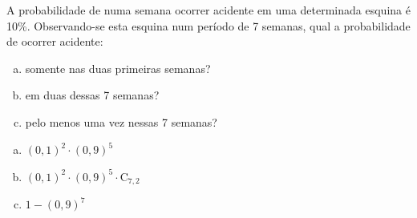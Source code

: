 \begin{ex}
  A probabilidade de numa semana ocorrer acidente em uma determinada esquina é 10\%. Observando-se esta esquina num período de 7 semanas, qual a probabilidade de ocorrer acidente:
    \begin{enumerate}[(a)]
    \item somente nas duas primeiras semanas?
    \item em duas dessas 7 semanas?
    \item pelo menos uma vez nessas 7 semanas?
    \end{enumerate}
      \begin{sol}
        \phantom{A}
         \begin{enumerate} [(a)]
             \item $(0,1)^2\cdot(0,9)^5$
             \item $(0,1)^2\cdot(0,9)^5\cdot\mathrm{C}_{7,2}$
             \item $1-(0,9)^7$
         \end{enumerate}
      \end{sol}
\end{ex}